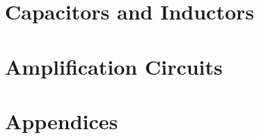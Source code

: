 \documentclass{book}
\begin{document}


%
%




\part{Capacitors and Inductors}









\part{Amplification Circuits}








% 

\part{Appendices}
\appendix


%


% 


\end{document}

